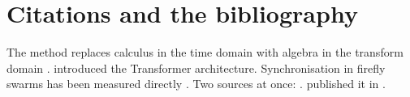 \documentclass[11pt,a4paper]{article}
\theoremstyle{definition}                   %
\begin{document}
\section{Citations and the bibliography}
%
%
%
%

The method replaces calculus in the time domain with algebra in the transform
domain \citep{kreyszig2011}.
\citet{vaswani2017} introduced the Transformer architecture.
Synchronisation in firefly swarms has been measured directly
\citep{sarfati2021}.
Two sources at once: \citep{kreyszig2011,vaswani2017}.
\citeauthor{vaswani2017} published it in \citeyear{vaswani2017}.
\nocite{lamport1994}     %

%




\end{document}
